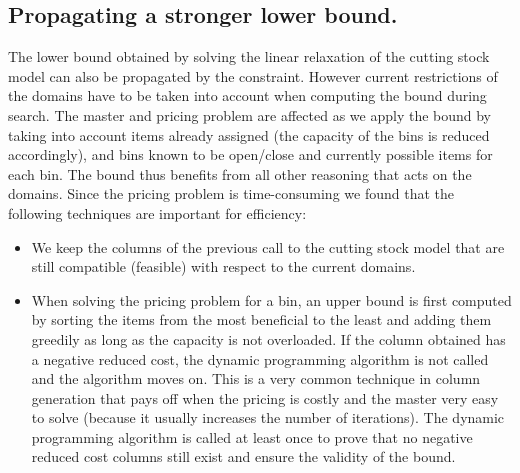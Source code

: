\subsection{Propagating a stronger lower bound.} The lower bound  obtained by solving the linear relaxation of the cutting stock model can also be propagated by the constraint. However current restrictions of the domains have to be taken into account when computing the bound during search. The master and pricing problem are affected as we apply the bound by taking into account items already assigned (the capacity of the bins is reduced accordingly), and bins known to be open/close and currently possible items for each bin. The bound thus benefits from all other reasoning that acts on the domains. Since the pricing problem is time-consuming we found that the following techniques are important for efficiency:
\begin{itemize}
\item We keep the columns of the previous call to the cutting stock model that are still compatible (feasible) with respect to the current domains.
\item When solving the pricing problem for a bin, an upper bound is first computed by sorting the items from the most beneficial to the least and adding them greedily as long as the capacity is not overloaded. If the column obtained has a negative reduced cost, the dynamic programming algorithm is not called and the algorithm moves on. This is a very common technique in column generation that pays off when the pricing is costly and the master very easy to solve (because it usually increases the number of iterations). The dynamic programming algorithm is called at least once to prove that no negative reduced cost columns still exist and ensure the validity of the bound.
\end{itemize}


